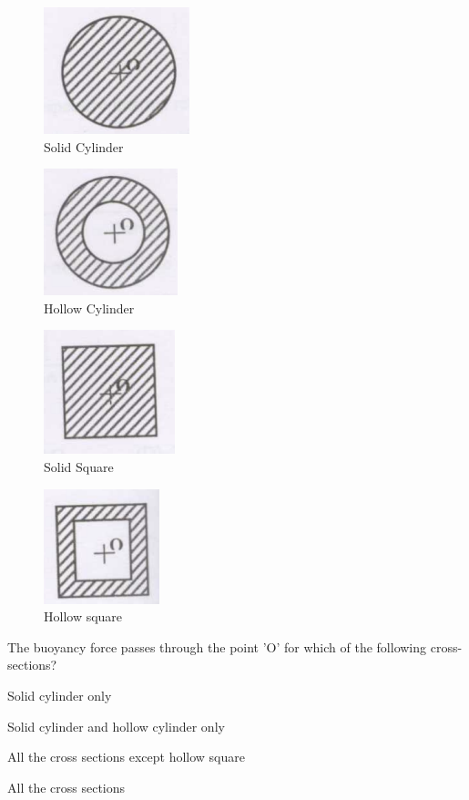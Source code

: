 \documentclass[12pt]{article}
\begin{document}
\begin{enumerate}
    
\begin{figure}[H]
\centering
  \includegraphics[width=0.2\columnwidth]{figs/ass1_d_q6_1.png}
  \caption{Solid Cylinder}
\end{figure} 
\begin{figure}[H]
\centering
  \includegraphics[width=0.2\columnwidth]{figs/ass1_d_q6_2.png}
  \caption{Hollow Cylinder}
  \end{figure} 
\begin{figure}[H]
\centering
  \includegraphics[width=0.2\columnwidth]{figs/ass1_d_q6_3.png}
  \caption{Solid Square}
  \end{figure} 
\begin{figure}[H]
  \centering
  \includegraphics[width=0.2\columnwidth]{figs/ass1_d_q6_4.png}
  \caption{Hollow square}
\end{figure}

The buoyancy force passes through the point 'O' for which of the following cross-sections?

\begin{enumerate}
\begin{multicols}{2}
\item  Solid cylinder only 
\item  Solid cylinder and hollow cylinder \newline only 
\item  All the cross sections except hollow square 
\item  All the cross sections
\end{multicols}
\end{enumerate}


\end{enumerate}
\end{document}
